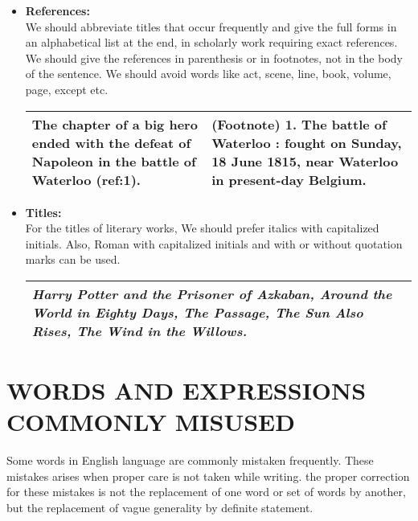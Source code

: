 \documentclass{report}
\begin{document}
\begin{itemize}
  \item
   \textbf{\Large{References:}}\\
    We should abbreviate titles that occur frequently and give the full forms in an alphabetical list at the end, in scholarly work requiring exact references. We should give the references in parenthesis or in footnotes, not in the body of the sentence. We should avoid words like act, scene, line, book, volume, page, except etc.
    
    \begin{center}
    \begin{tabular}{|C{5.5cm}|C{5.5cm}|}
     \hline
     The chapter of a big hero ended with the defeat
     of Napoleon in the battle of Waterloo (ref:1).
     & (Footnote) 1. The battle of Waterloo : fought on Sunday, 18 June 1815,
     near Waterloo in present-day Belgium.\\\hline
    \end{tabular}
    \end{center}
    \bigskip
    
   \item
    \textbf{\Large{Titles:}}\\
    For the titles of literary works, We should prefer italics with capitalized initials.
    Also, Roman with capitalized initials and with or without quotation marks can be used.

    \begin{center}
    \begin{tabular}{|C{6cm}|}
     \hline
     \textit{Harry Potter and the Prisoner of Azkaban, Around the World in Eighty Days,
     The Passage, The Sun Also Rises, The Wind in the Willows.}\\\hline
    \end{tabular}
    \end{center}
    
    \newpage    
\end{itemize}


\chapter{WORDS AND EXPRESSIONS COMMONLY MISUSED}

Some words in English language are commonly mistaken frequently. These mistakes arises when proper care is not taken while writing. the proper correction for these mistakes is not the replacement of one word or set of words by another, but the replacement of vague generality by definite statement.
\bigskip
\end{document}
